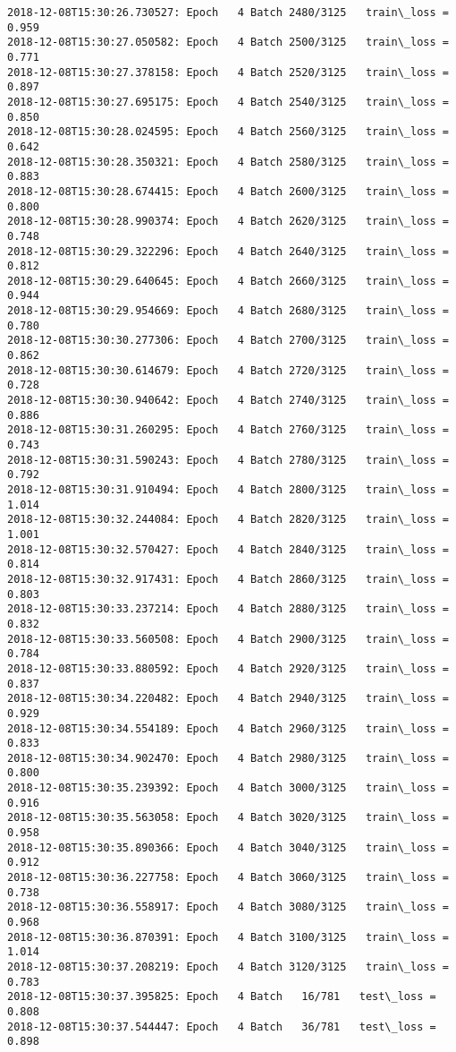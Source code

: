 \documentclass[11pt]{article}
\begin{document}
\begin{Verbatim}[commandchars=\\\{\}]
2018-12-08T15:30:26.730527: Epoch   4 Batch 2480/3125   train\_loss = 0.959
2018-12-08T15:30:27.050582: Epoch   4 Batch 2500/3125   train\_loss = 0.771
2018-12-08T15:30:27.378158: Epoch   4 Batch 2520/3125   train\_loss = 0.897
2018-12-08T15:30:27.695175: Epoch   4 Batch 2540/3125   train\_loss = 0.850
2018-12-08T15:30:28.024595: Epoch   4 Batch 2560/3125   train\_loss = 0.642
2018-12-08T15:30:28.350321: Epoch   4 Batch 2580/3125   train\_loss = 0.883
2018-12-08T15:30:28.674415: Epoch   4 Batch 2600/3125   train\_loss = 0.800
2018-12-08T15:30:28.990374: Epoch   4 Batch 2620/3125   train\_loss = 0.748
2018-12-08T15:30:29.322296: Epoch   4 Batch 2640/3125   train\_loss = 0.812
2018-12-08T15:30:29.640645: Epoch   4 Batch 2660/3125   train\_loss = 0.944
2018-12-08T15:30:29.954669: Epoch   4 Batch 2680/3125   train\_loss = 0.780
2018-12-08T15:30:30.277306: Epoch   4 Batch 2700/3125   train\_loss = 0.862
2018-12-08T15:30:30.614679: Epoch   4 Batch 2720/3125   train\_loss = 0.728
2018-12-08T15:30:30.940642: Epoch   4 Batch 2740/3125   train\_loss = 0.886
2018-12-08T15:30:31.260295: Epoch   4 Batch 2760/3125   train\_loss = 0.743
2018-12-08T15:30:31.590243: Epoch   4 Batch 2780/3125   train\_loss = 0.792
2018-12-08T15:30:31.910494: Epoch   4 Batch 2800/3125   train\_loss = 1.014
2018-12-08T15:30:32.244084: Epoch   4 Batch 2820/3125   train\_loss = 1.001
2018-12-08T15:30:32.570427: Epoch   4 Batch 2840/3125   train\_loss = 0.814
2018-12-08T15:30:32.917431: Epoch   4 Batch 2860/3125   train\_loss = 0.803
2018-12-08T15:30:33.237214: Epoch   4 Batch 2880/3125   train\_loss = 0.832
2018-12-08T15:30:33.560508: Epoch   4 Batch 2900/3125   train\_loss = 0.784
2018-12-08T15:30:33.880592: Epoch   4 Batch 2920/3125   train\_loss = 0.837
2018-12-08T15:30:34.220482: Epoch   4 Batch 2940/3125   train\_loss = 0.929
2018-12-08T15:30:34.554189: Epoch   4 Batch 2960/3125   train\_loss = 0.833
2018-12-08T15:30:34.902470: Epoch   4 Batch 2980/3125   train\_loss = 0.800
2018-12-08T15:30:35.239392: Epoch   4 Batch 3000/3125   train\_loss = 0.916
2018-12-08T15:30:35.563058: Epoch   4 Batch 3020/3125   train\_loss = 0.958
2018-12-08T15:30:35.890366: Epoch   4 Batch 3040/3125   train\_loss = 0.912
2018-12-08T15:30:36.227758: Epoch   4 Batch 3060/3125   train\_loss = 0.738
2018-12-08T15:30:36.558917: Epoch   4 Batch 3080/3125   train\_loss = 0.968
2018-12-08T15:30:36.870391: Epoch   4 Batch 3100/3125   train\_loss = 1.014
2018-12-08T15:30:37.208219: Epoch   4 Batch 3120/3125   train\_loss = 0.783
2018-12-08T15:30:37.395825: Epoch   4 Batch   16/781   test\_loss = 0.808
2018-12-08T15:30:37.544447: Epoch   4 Batch   36/781   test\_loss = 0.898

\end{Verbatim}
\end{document}
